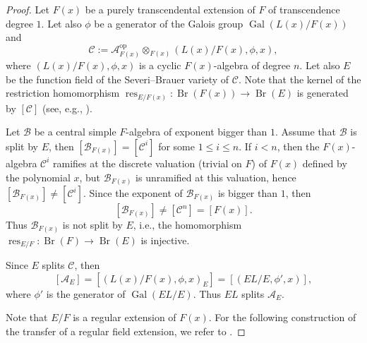 \documentclass[10pt]{article}
\theoremstyle{definition}
\DeclareMathOperator{\Br}{Br}
\DeclareMathOperator{\Gal}{Gal}
\DeclareMathOperator{\res}{res}
\newcommand{\A}{\mathcal A}
\newcommand{\B}{\mathcal B}
\newcommand{\C}{\mathcal C}
\begin{document}
\begin{proof}
Let $F(x)$ be a purely transcendental extension of $F$ of transcendence degree $1$. Let also $\phi$ be a generator of the Galois group $\Gal(L(x)/F(x))$ and
\[
\C:=\A^{\mathrm{op}}_{F(x)}\otimes_{F(x)}(L(x)/F(x),\phi,x),
\]
where $(L(x)/F(x),\phi,x)$ is a cyclic $F(x)$-algebra of degree $n$. Let also $E$ be the function field of the Severi--Brauer variety of $\C$. Note that the kernel of the restriction homomorphism $\res_{E/F(x)}:\Br(F(x))\to\Br(E)$ is generated by $[\C]$ (see, e.g., \cite[Cor. 13.16]{r8}).

Let $\B$ be a central simple $F$-algebra of exponent bigger than $1$. Assume that $\B$ is split by $E$, then $[\B_{F(x)}]=[\C^i]$ for some $1\leq i\leq n$. If $i<n$, then the $F(x)$-algebra $\C^i$ ramifies at the discrete valuation (trivial on $F$) of $F(x)$ defined by the polynomial $x$, but $\B_{F(x)}$ is unramified at this valuation, hence $[\B_{F(x)}]\neq[\C^i]$. Since the exponent of $\B_{F(x)}$ is bigger than $1$, then
\[
[\B_{F(x)}]\neq[\C^n]=[F(x)].
\]
Thus $\B_{F(x)}$ is not split by $E$, i.e., the homomorphism $\res_{E/F}:\Br(F)\to\Br(E)$ is injective.

Since $E$ splits $\C$, then
\[
[\A_E]=[(L(x)/F(x),\phi,x)_E]=[(EL/E,\phi',x)],
\]
where $\phi'$ is the generator of $\Gal(EL/E)$. Thus $EL$ splits $\A_E$.

Note that $E/F$ is a regular extension of $F(x)$. For the following construction of the transfer of a regular field extension, we refer to \cite[p. 220]{r7}.


\end{proof}
\end{document}
